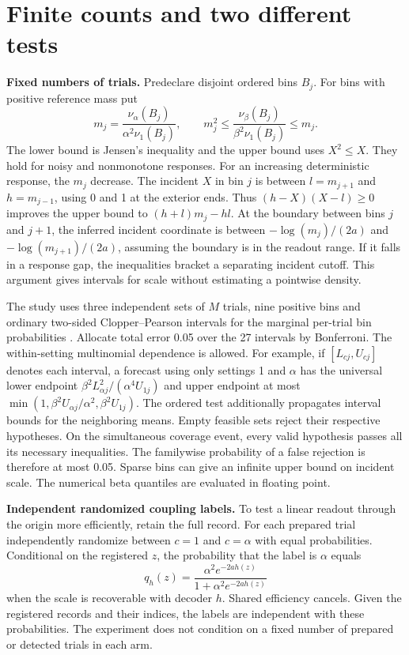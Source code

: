 \documentclass[10pt,a4paper]{article}
\begin{document}
\section{Finite counts and two different tests}
\textbf{Fixed numbers of trials.} Predeclare disjoint ordered bins $B_j$. For bins with positive reference mass put
\[
 m_j=\frac{\nu_\alpha(B_j)}{\alpha^2\nu_1(B_j)},\qquad
 m_j^2\le\frac{\nu_\beta(B_j)}{\beta^2\nu_1(B_j)}\le m_j .
\]
The lower bound is Jensen's inequality and the upper bound uses $X^2\le X$. They hold for noisy and nonmonotone responses. For an increasing deterministic response, the $m_j$ decrease. The incident $X$ in bin $j$ is between $l=m_{j+1}$ and $h=m_{j-1}$, using 0 and 1 at the exterior ends. Thus $(h-X)(X-l)\ge0$ improves the upper bound to $(h+l)m_j-hl$. At the boundary between bins $j$ and $j+1$, the inferred incident coordinate is between $-\log(m_j)/(2a)$ and $-\log(m_{j+1})/(2a)$, assuming the boundary is in the readout range. If it falls in a response gap, the inequalities bracket a separating incident cutoff. This argument gives intervals for scale without estimating a pointwise density.

The study uses three independent sets of $M$ trials, nine positive bins and ordinary two-sided Clopper--Pearson intervals for the marginal per-trial bin probabilities \cite{clopper}. Allocate total error 0.05 over the 27 intervals by Bonferroni. The within-setting multinomial dependence is allowed. For example, if $[L_{cj},U_{cj}]$ denotes each interval, a forecast using only settings 1 and $\alpha$ has the universal lower endpoint $\beta^2L_{\alpha j}^2/(\alpha^4U_{1j})$ and upper endpoint at most $\min(1,\beta^2U_{\alpha j}/\alpha^2,\beta^2U_{1j})$. The ordered test additionally propagates interval bounds for the neighboring means. Empty feasible sets reject their respective hypotheses. On the simultaneous coverage event, every valid hypothesis passes all its necessary inequalities. The familywise probability of a false rejection is therefore at most 0.05. Sparse bins can give an infinite upper bound on incident scale. The numerical beta quantiles are evaluated in floating point.

\textbf{Independent randomized coupling labels.} To test a linear readout through the origin more efficiently, retain the full record. For each prepared trial independently randomize between $c=1$ and $c=\alpha$ with equal probabilities. Conditional on the registered $z$, the probability that the label is $\alpha$ equals
\[
 q_h(z)=\frac{\alpha^2 e^{-2a h(z)}}{1+\alpha^2 e^{-2a h(z)}}
\]
when the scale is recoverable with decoder $h$. Shared efficiency cancels. Given the registered records and their indices, the labels are independent with these probabilities. The experiment does not condition on a fixed number of prepared or detected trials in each arm.
\end{document}

